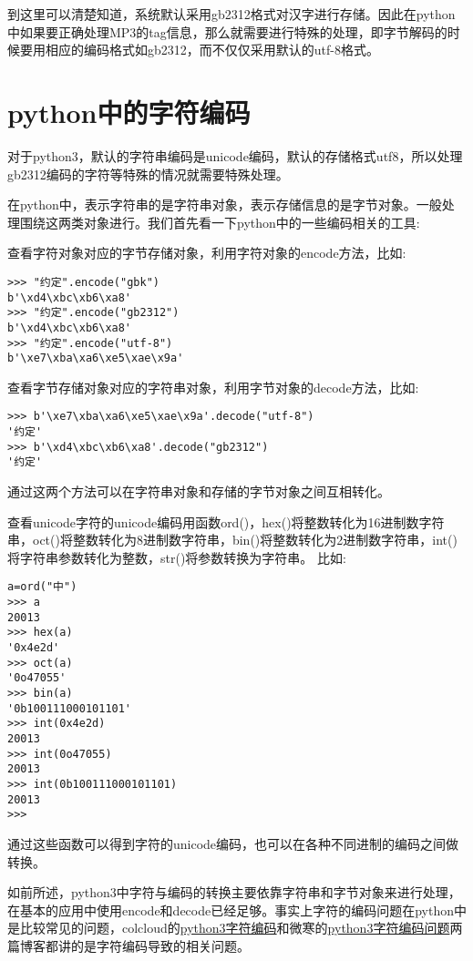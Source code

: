 \documentclass[twoside,11pt]{book}
\begin{document}
到这里可以清楚知道，系统默认采用gb2312格式对汉字进行存储。因此在python中如果要正确处理MP3的tag信息，那么就需要进行特殊的处理，即字节解码的时候要用相应的编码格式如gb2312，而不仅仅采用默认的utf-8格式。

\section{python中的字符编码}

对于python3，默认的字符串编码是unicode编码，默认的存储格式utf8，所以处理gb2312编码的字符等特殊的情况就需要特殊处理。

在python中，表示字符串的是字符串对象，表示存储信息的是字节对象。一般处理围绕这两类对象进行。我们首先看一下python中的一些编码相关的工具:

查看字符对象对应的字节存储对象，利用字符对象的encode方法，比如:
\begin{lstlisting}
>>> "约定".encode("gbk")
b'\xd4\xbc\xb6\xa8'
>>> "约定".encode("gb2312")
b'\xd4\xbc\xb6\xa8'
>>> "约定".encode("utf-8")
b'\xe7\xba\xa6\xe5\xae\x9a'
\end{lstlisting}

查看字节存储对象对应的字符串对象，利用字节对象的decode方法，比如:
\begin{lstlisting}
>>> b'\xe7\xba\xa6\xe5\xae\x9a'.decode("utf-8")
'约定'
>>> b'\xd4\xbc\xb6\xa8'.decode("gb2312")
'约定'
\end{lstlisting}

通过这两个方法可以在字符串对象和存储的字节对象之间互相转化。

查看unicode字符的unicode编码用函数ord()，hex()将整数转化为16进制数字符串，oct()将整数转化为8进制数字符串，bin()将整数转化为2进制数字符串，int()将字符串参数转化为整数，str()将参数转换为字符串。
比如:
\begin{lstlisting}
a=ord("中")
>>> a
20013
>>> hex(a)
'0x4e2d'
>>> oct(a)
'0o47055'
>>> bin(a)
'0b100111000101101'
>>> int(0x4e2d)
20013
>>> int(0o47055)
20013
>>> int(0b100111000101101)
20013
>>>
\end{lstlisting}

通过这些函数可以得到字符的unicode编码，也可以在各种不同进制的编码之间做转换。

如前所述，python3中字符与编码的转换主要依靠字符串和字节对象来进行处理，在基本的应用中使用encode和decode已经足够。事实上字符的编码问题在python中是比较常见的问题，colcloud的\href{www.unicode.org}{python3字符编码}和微寒的\href{www.unicode.org}{python3字符编码问题}两篇博客都讲的是字符编码导致的相关问题。
\end{document}

